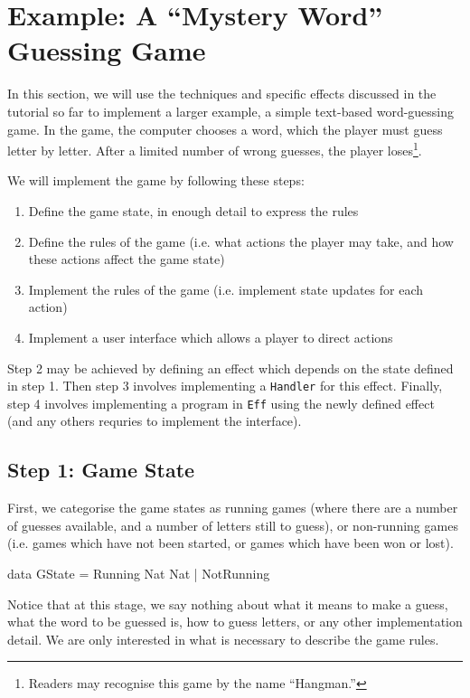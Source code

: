 \section{Example: A ``Mystery Word'' Guessing Game}

\label{sect:hangman}

In this section, we will use the techniques and specific effects discussed
in the tutorial so far to implement a larger example, a simple text-based
word-guessing game. In the game, the computer chooses a word, which the
player must guess letter by letter. After a limited number of wrong
guesses, the player loses\footnote{Readers may recognise this game
by the name ``Hangman.''}.

We will implement the game by following these steps:

\begin{enumerate}
\item Define the game state, in enough detail to express the rules
\item Define the rules of the game (i.e. what actions the player may take, 
and how these actions affect the game state)
\item Implement the rules of the game (i.e. implement state updates for each 
action)
\item Implement a user interface which allows a player to direct actions
\end{enumerate}

\noindent
Step 2 may be achieved by defining an effect which depends on the state defined
in step 1. Then step 3 involves implementing a \texttt{Handler} for this effect.
Finally, step 4 involves implementing a program in \texttt{Eff} using the
newly defined effect (and any others requries to implement the interface).

\subsection{Step 1: Game State}

First, we categorise the game states as running games (where there are a 
number of guesses available, and a number of letters still to guess), or
non-running games (i.e. games which have not been started, or games which
have been won or lost).

\begin{code}
data GState = Running Nat Nat | NotRunning
\end{code}

\noindent
Notice that at this stage, we say nothing about what it means to make a guess,
what the word to be guessed is, how to guess letters, or any other implementation
detail. We are only interested in what is necessary to describe the game
rules.


